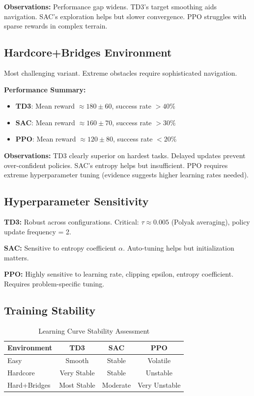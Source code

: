 \documentclass[10pt,a4paper,twocolumn]{article}
\begin{document}
\textbf{Observations:} Performance gap widens. TD3's target smoothing aids navigation. SAC's exploration helps but slower convergence. PPO struggles with sparse rewards in complex terrain.

\subsection{Hardcore+Bridges Environment}

Most challenging variant. Extreme obstacles require sophisticated navigation.

\textbf{Performance Summary:}
\begin{itemize}
    \item \textbf{TD3}: Mean reward $\approx 180 \pm 60$, success rate $>40\%$
    \item \textbf{SAC}: Mean reward $\approx 160 \pm 70$, success rate $>30\%$
    \item \textbf{PPO}: Mean reward $\approx 120 \pm 80$, success rate $<20\%$
\end{itemize}

\textbf{Observations:} TD3 clearly superior on hardest tasks. Delayed updates prevent over-confident policies. SAC's entropy helps but insufficient. PPO requires extreme hyperparameter tuning (evidence suggests higher learning rates needed).

\subsection{Hyperparameter Sensitivity}

\textbf{TD3:} Robust across configurations. Critical: $\tau \approx 0.005$ (Polyak averaging), policy update frequency = 2.

\textbf{SAC:} Sensitive to entropy coefficient $\alpha$. Auto-tuning helps but initialization matters.

\textbf{PPO:} Highly sensitive to learning rate, clipping epsilon, entropy coefficient. Requires problem-specific tuning.

\subsection{Training Stability}

\begin{table}[H]
\centering\small
\begin{tabular}{lccc}
\toprule
\textbf{Environment} & \textbf{TD3} & \textbf{SAC} & \textbf{PPO} \\
\midrule
Easy & Smooth & Stable & Volatile \\
Hardcore & Very Stable & Stable & Unstable \\
Hard+Bridges & Most Stable & Moderate & Very Unstable \\
\bottomrule
\end{tabular}
\caption{Learning Curve Stability Assessment}
\label{tab:stability}
\end{table}
\end{document}

